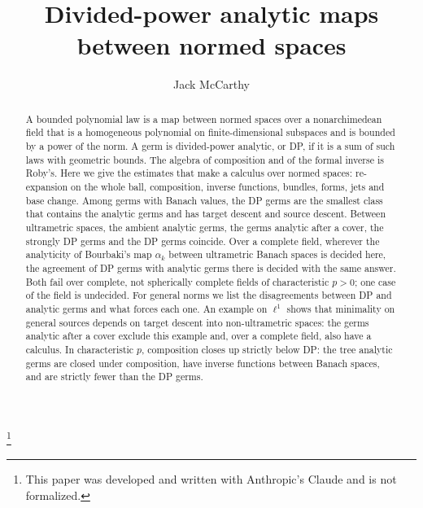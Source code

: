 \setlength{\emergencystretch}{1em}
\title{Divided-power analytic maps between normed spaces}
\author{Jack McCarthy}
\thanks{This paper was developed and written with Anthropic's Claude and is not formalized.}
\makeatletter
\g@addto@macro{}
\makeatother

\begin{abstract}
A bounded polynomial law is a map between normed spaces over a nonarchimedean field that is a homogeneous polynomial on
finite-dimensional subspaces and is bounded by a power of the norm. A germ is divided-power analytic, or DP, if it is a
sum of such laws with geometric bounds. The algebra of composition and of the formal inverse is Roby's. Here we give the
estimates that make a calculus over normed spaces: re-expansion on the whole ball, composition, inverse functions,
bundles, forms, jets and base change. Among germs with Banach values, the DP germs are the smallest class that contains
the analytic germs and has target descent and source descent. Between ultrametric spaces, the ambient analytic germs, the
germs analytic after a cover, the strongly DP germs and the DP germs coincide. Over a complete field, wherever the
analyticity of Bourbaki's map $\alpha_k$ between ultrametric Banach spaces is decided here, the agreement of DP germs with
analytic germs there is decided with the same answer. Both fail over complete, not spherically complete fields of
characteristic $p>0$; one case of the field is undecided. For general norms we list the disagreements between DP and
analytic germs and what forces each one. An example on $\ell^1$ shows that minimality on general sources depends on target
descent into non-ultrametric spaces: the germs analytic after a cover exclude this example and, over a complete field, also have a calculus. In
characteristic $p$, composition closes up strictly below DP: the tree analytic germs are closed under composition, have
inverse functions between Banach spaces, and are strictly fewer than the DP germs.
\end{abstract}
\maketitle
\setcounter{tocdepth}{1}
\begingroup
\small
\linespacing=8pt
\tableofcontents\removelastskip
\endgroup
\clearpage
